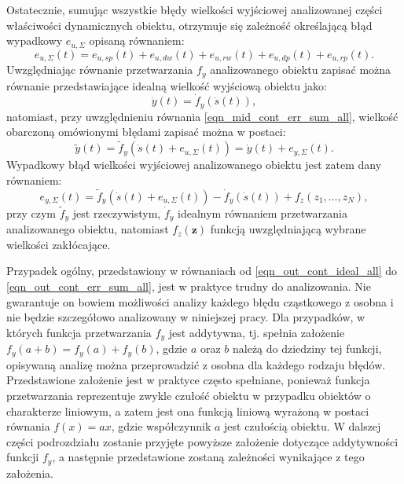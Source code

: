 Ostatecznie, sumując wszystkie błędy wielkości wyjściowej analizowanej części właściwości dynamicznych obiektu, otrzymuje się zależność określającą błąd wypadkowy $e_{u,\Sigma}$ opisaną równaniem:
\begin{equation}
e_{u,\Sigma} \left( t \right) = e_{u,sp} \left( t \right) + e_{u,dw} \left( t \right) + e_{u,rw} \left( t \right) + e_{u,dp} \left( t \right) + e_{u,rp} \left( t \right) \label{eqn_mid_cont_err_sum_all}.
\end{equation}
Uwzględniając równanie przetwarzania $f_{y}$ analizowanego obiektu zapisać można równanie przedstawiające idealną wielkość wyjściową obiektu jako:
\begin{equation}
\dot{y} \left( t \right) = \dot{f}_{y} \left( \dot{s} \left( t \right) \right) \label{eqn_out_cont_ideal_all},
\end{equation}
natomiast, przy uwzględnieniu równania \eqref{eqn_mid_cont_err_sum_all}, wielkość obarczoną omówionymi błędami zapisać można w postaci:
\begin{equation}
\tilde{y} \left( t \right) = \tilde{f}_{y} \left( \dot{s} \left( t \right) + e_{u,\Sigma} \left( t \right) \right) = \dot{y} \left( t \right) + e_{y,\Sigma} \left( t \right) \label{eqn_out_cont_real_all}.
\end{equation}
Wypadkowy błąd wielkości wyjściowej analizowanego obiektu jest zatem dany równaniem:
\begin{equation}
e_{y,\Sigma} \left( t \right) = \tilde{f}_{y} \left( \dot{s} \left( t \right) + e_{u,\Sigma} \left( t \right) \right) - \dot{f}_{y} \left( \dot{s} \left( t \right) \right) + f_{z} \left( z_{1}, \hdots, z_{N} \right) \label{eqn_out_cont_err_sum_all},
\end{equation}
przy czym $\tilde{f}_{y}$ jest rzeczywistym, $\dot{f}_{y}$ idealnym równaniem przetwarzania analizowanego obiektu, natomiast $f_{z}(\mathbf{z})$ funkcją uwzględniającą wybrane wielkości zakłócające.

Przypadek ogólny, przedstawiony w równaniach od \eqref{eqn_out_cont_ideal_all} do \eqref{eqn_out_cont_err_sum_all}, jest w praktyce trudny do analizowania. Nie gwarantuje on bowiem możliwości analizy każdego błędu cząstkowego z osobna i nie będzie szczegółowo analizowany w niniejszej pracy. Dla przypadków, w których funkcja przetwarzania $f_{y}$ jest addytywna, tj. spełnia założenie $f_{y}(a + b) = f_{y}(a) + f_{y}(b)$, gdzie $a$ oraz $b$ należą do dziedziny tej funkcji, opisywaną analizę można przeprowadzić z osobna dla każdego rodzaju błędów. Przedstawione założenie jest w praktyce często spełniane, ponieważ funkcja przetwarzania reprezentuje zwykle czułość obiektu w przypadku obiektów o charakterze liniowym, a zatem jest ona funkcją liniową wyrażoną w postaci równania $f(x) = ax$, gdzie współczynnik $a$ jest czułością obiektu. W dalszej części podrozdziału zostanie przyjęte powyższe założenie dotyczące addytywności funkcji $f_{y}$, a następnie przedstawione zostaną zależności wynikające z tego założenia.

